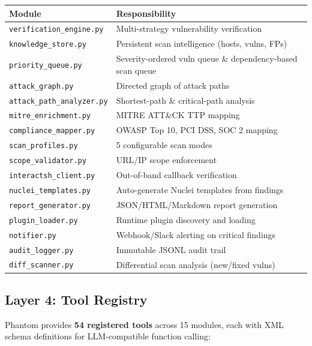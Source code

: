 \documentclass[12pt,a4paper]{article}
\begin{document}
\begin{longtable}{ll}
\toprule
\textbf{Module} & \textbf{Responsibility} \\
\midrule
\texttt{verification\_engine.py}    & Multi-strategy vulnerability verification \\
\texttt{knowledge\_store.py}        & Persistent scan intelligence (hosts, vulns, FPs) \\
\texttt{priority\_queue.py}         & Severity-ordered vuln queue \& dependency-based scan queue \\
\texttt{attack\_graph.py}           & Directed graph of attack paths \\
\texttt{attack\_path\_analyzer.py}  & Shortest-path \& critical-path analysis \\
\texttt{mitre\_enrichment.py}       & MITRE ATT\&CK TTP mapping \\
\texttt{compliance\_mapper.py}      & OWASP Top 10, PCI DSS, SOC 2 mapping \\
\texttt{scan\_profiles.py}          & 5 configurable scan modes \\
\texttt{scope\_validator.py}        & URL/IP scope enforcement \\
\texttt{interactsh\_client.py}      & Out-of-band callback verification \\
\texttt{nuclei\_templates.py}       & Auto-generate Nuclei templates from findings \\
\texttt{report\_generator.py}       & JSON/HTML/Markdown report generation \\
\texttt{plugin\_loader.py}          & Runtime plugin discovery and loading \\
\texttt{notifier.py}                & Webhook/Slack alerting on critical findings \\
\texttt{audit\_logger.py}           & Immutable JSONL audit trail \\
\texttt{diff\_scanner.py}           & Differential scan analysis (new/fixed vulns) \\
\bottomrule
\end{longtable}

\subsection{Layer 4: Tool Registry}

Phantom provides \textbf{54 registered tools} across 15 modules,
each with XML schema definitions for LLM-compatible function calling:
\end{document}
